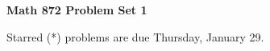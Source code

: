 \documentclass[12pt]{article}
\begin{document}
\def\ctln{\centerline}
\def\msk{\medskip}
\def\bsk{\bigskip}
\def\ssk{\smallskip}
\def\hsk{\hskip.3in}
\def\ra{\rightarrow}
\def\ubr{\underbar}

\def\mt{{\mathcal T}}
\def\mb{{\mathcal B}}
\def\ms{{\mathcal S}}
\def\mu{{\mathcal U}}
\def\mv{{\mathcal V}}

\def\bbr{{\mathbb R}}
\def\bbz{{\mathbb Z}}
\def\spc{$~$\hskip.15in$~$}

\def\sset{\subseteq}
\def\del{\partial}
\def\lra{$\Leftrightarrow$}
\def\bra{$\Rightarrow$}




\ctln{\bf Math 872 Problem Set 1}

\msk

Starred (*) problems are due Thursday, January 29.
\end{document}
